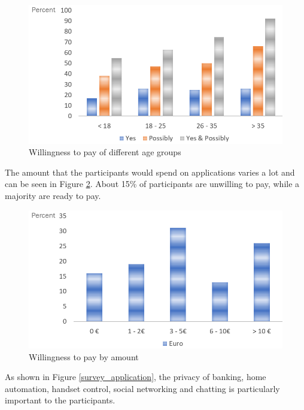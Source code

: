 \begin{figure}[h]
	\centering
	\includegraphics[width=0.9\linewidth]{Picture/umfrage_geld_gruppen}
	\caption[Willingness to pay of different age groups]{Willingness to pay of different age groups}
	\label{fig:umfrage_geld_gruppen}
\end{figure}

The amount that the participants would spend on applications varies a lot and can be seen in Figure \ref{fig:umfrage_betrag}. About 15\% of participants are unwilling to pay, while a majority are ready to pay.

\begin{figure}[h]
	\centering
	\includegraphics[width=0.9\linewidth]{Picture/umfrage_betrag}
	\caption[Willingness to pay by amount]{Willingness to pay by amount}
	\label{fig:umfrage_betrag}
\end{figure}

As shown in Figure \ref{survey_application}, the privacy of banking, home automation, handset control, social networking and chatting is particularly important to the participants.

